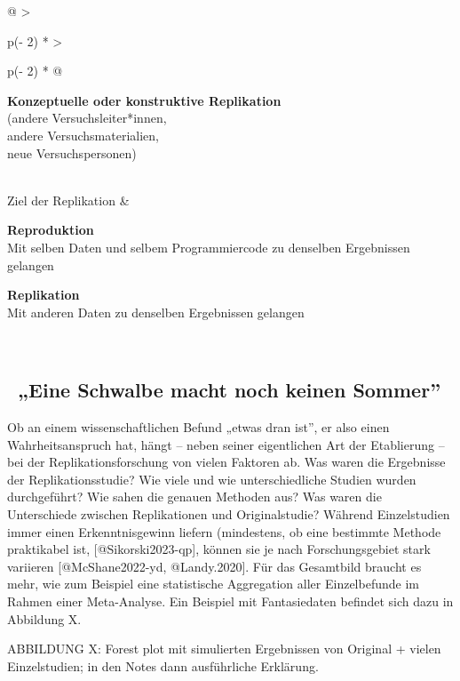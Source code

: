 \documentclass[
  letterpaper,
  DIV=11,
  numbers=noendperiod]{scrreprt}
\begin{document}
\begin{longtable}[]{@{}
  >{\raggedright\arraybackslash}p{(\columnwidth - 2\tabcolsep) * }
  >{\raggedright\arraybackslash}p{(\columnwidth - 2\tabcolsep) * }@{}}
\begin{minipage}[t]{\linewidth}
\textbf{Konzeptuelle oder konstruktive Replikation}\\
(andere Versuchsleiter*innen,\\
andere Versuchsmaterialien,\\
neue Versuchspersonen)\strut
\end{minipage} \\
Ziel der Replikation & \begin{minipage}[t]{\linewidth}\raggedright
\textbf{Reproduktion}\\
Mit selben Daten und selbem Programmiercode zu denselben Ergebnissen
gelangen

\textbf{Replikation}\\
Mit anderen Daten zu denselben Ergebnissen gelangen\strut
\end{minipage} \\
\end{longtable}

\subsection{~„Eine Schwalbe macht noch keinen
Sommer''}\label{eine-schwalbe-macht-noch-keinen-sommer}

Ob an einem wissenschaftlichen Befund „etwas dran ist'', er also einen
Wahrheitsanspruch hat, hängt -- neben seiner eigentlichen Art der
Etablierung -- bei der Replikationsforschung von vielen Faktoren ab. Was
waren die Ergebnisse der Replikationsstudie? Wie viele und wie
unterschiedliche Studien wurden durchgeführt? Wie sahen die genauen
Methoden aus? Was waren die Unterschiede zwischen Replikationen und
Originalstudie? Während Einzelstudien immer einen Erkenntnisgewinn
liefern (mindestens, ob eine bestimmte Methode praktikabel ist,
{[}@Sikorski2023-qp{]}, können sie je nach Forschungsgebiet stark
variieren {[}@McShane2022-yd, @Landy.2020{]}. Für das Gesamtbild braucht
es mehr, wie zum Beispiel eine statistische Aggregation aller
Einzelbefunde im Rahmen einer Meta-Analyse. Ein Beispiel mit
Fantasiedaten befindet sich dazu in Abbildung X.

ABBILDUNG X: Forest plot mit simulierten Ergebnissen von Original +
vielen Einzelstudien; in den Notes dann ausführliche Erklärung.
\end{document}

